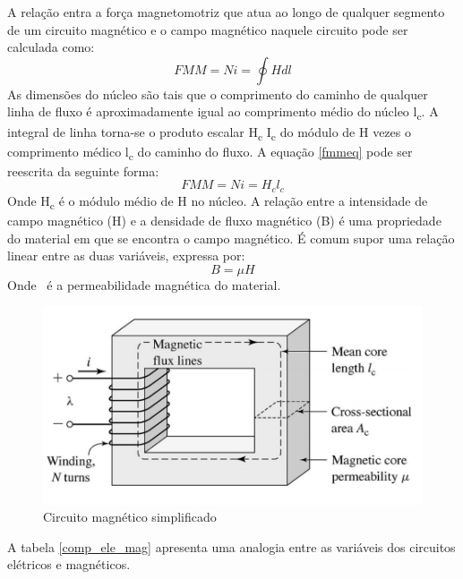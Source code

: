 A relação entra a força magnetomotriz que atua ao longo de qualquer segmento de um circuito magnético e o campo magnético naquele circuito pode ser calculada como:
\begin{equation}
\label{fmmeq}
FMM = Ni = \oint H dl
\end{equation}
As dimensões do núcleo são tais que o comprimento do caminho de qualquer linha de fluxo é aproximadamente igual ao comprimento médio do núcleo l\textsubscript{c}. A integral de linha torna-se o produto escalar H\textsubscript{c} I\textsubscript{c} do módulo de H vezes o comprimento médico l\textsubscript{c} do caminho do fluxo. A equação \ref{fmmeq} pode ser reescrita da seguinte forma:
\begin{equation}
FMM = Ni = H_{c}l_{c}
\end{equation}
Onde H\textsubscript{c} é o módulo médio de H no núcleo.
A relação entre a intensidade de campo magnético (H) e a densidade de fluxo magnético (B) é uma propriedade do material em que se encontra o campo magnético. É comum supor uma relação linear entre as duas variáveis, expressa por:
\begin{equation}
B = \mu H
\end{equation}
Onde \textmu \ é a permeabilidade magnética do material.
\begin{figure}[H]
\centering
\includegraphics[scale=0.55]{img/simple_magnetic_circuit.png}
\caption[Circuito magnético simplificado]{Circuito magnético simplificado}
\label{circ_mag_simp}
\end{figure}
A tabela \ref{comp_ele_mag} apresenta uma analogia entre as variáveis dos circuitos elétricos e magnéticos.
